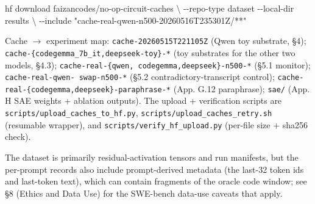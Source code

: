 \documentclass[
  11pt,
  a4paper]{article}
\newenvironment{Shaded}{}{}
\newcommand{\AttributeTok}[1]{\textcolor[rgb]{0.49,0.56,0.16}{#1}}
\newcommand{\DataTypeTok}[1]{\textcolor[rgb]{0.56,0.13,0.00}{#1}}
\newcommand{\ExtensionTok}[1]{#1}
\newcommand{\NormalTok}[1]{#1}
\newcommand{\StringTok}[1]{\textcolor[rgb]{0.25,0.44,0.63}{#1}}
\begin{document}
\begin{Shaded}
\begin{Highlighting}[]
\ExtensionTok{hf}\NormalTok{ download faizancodes/no{-}op{-}circuit{-}caches }\DataTypeTok{\textbackslash{}}
 \AttributeTok{{-}{-}repo{-}type}\NormalTok{ dataset }\AttributeTok{{-}{-}local{-}dir}\NormalTok{ results }\DataTypeTok{\textbackslash{}}
 \AttributeTok{{-}{-}include} \StringTok{"cache{-}real{-}qwen{-}n500{-}20260516T235301Z/**"}
\end{Highlighting}
\end{Shaded}

Cache \ensuremath{\rightarrow} experiment map: \texttt{cache-20260515T221105Z} (Qwen toy
substrate, \S{}4); \texttt{cache-\{codegemma\_7b\_it,deepseek-toy\}-*} (toy
substrates for the other two models, \S{}4.3);
\texttt{cache-real-\{qwen,\ codegemma,deepseek\}-n500-*} (\S{}5.1 monitor);
\texttt{cache-real-qwen-\ swap-n500-*} (\S{}5.2 contradictory-transcript
control); \texttt{cache-real-\{codegemma,deepseek\}-paraphrase-*} (App.
G.12 paraphrase); \texttt{sae/} (App. H SAE weights + ablation outputs).
The upload + verification scripts are
\texttt{scripts/upload\_caches\_to\_hf.py},
\texttt{scripts/upload\_caches\_retry.sh} (resumable wrapper), and
\texttt{scripts/verify\_hf\_upload.py} (per-file size + sha256 check).

The dataset is primarily residual-activation tensors and run manifests,
but the per-prompt records also include prompt-derived metadata (the
last-32 token ids and last-token text), which can contain fragments of
the oracle code window; see \S{}8 (Ethics and Data Use) for the SWE-bench
data-use caveats that apply.
\end{document}
